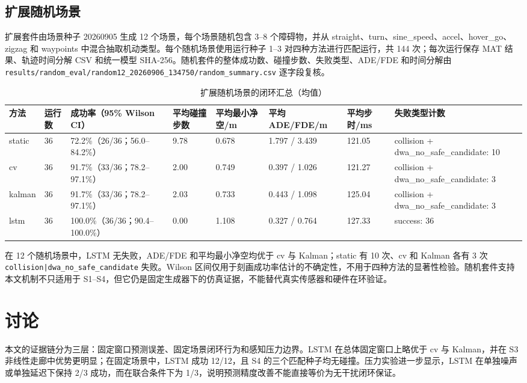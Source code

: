 \documentclass[11pt,a4paper]{ctexart}
\begin{document}
\subsection{扩展随机场景}

扩展套件由场景种子 20260905 生成 12 个场景，每个场景随机包含 3–8 个障碍物，并从 straight、turn、sine\_speed、accel、hover\_go、zigzag 和 waypoints 中混合抽取机动类型。每个随机场景使用运行种子 1–3 对四种方法进行匹配运行，共 144 次；每次运行保存 MAT 结果、轨迹时间分解 CSV 和统一模型 SHA-256。随机套件的整体成功数、碰撞步数、失败类型、ADE/FDE 和时间分解由 \texttt{results/random\_eval/random12\_20260906\_134750/random\_summary.csv} 逐字段复核。

\begin{table}[t]
\centering
\small
\caption{扩展随机场景的闭环汇总（均值）}
\label{tab:table-9}
\begin{tabularx}{\linewidth}{YYYYYYYY}
\toprule
方法 & 运行数 & 成功率（95\% Wilson CI） & 平均碰撞步数 & 平均最小净空/m & 平均 ADE/FDE/m & 平均步时/ms & 失败类型计数 \\
\midrule
static & 36 & 72.2\%（26/36；56.0–84.2\%） & 9.78 & 0.678 & 1.797 / 3.439 & 121.05 & collision + dwa\_no\_safe\_candidate: 10 \\
cv & 36 & 91.7\%（33/36；78.2–97.1\%） & 2.00 & 0.749 & 0.397 / 1.026 & 121.27 & collision + dwa\_no\_safe\_candidate: 3 \\
kalman & 36 & 91.7\%（33/36；78.2–97.1\%） & 2.03 & 0.733 & 0.443 / 1.098 & 125.04 & collision + dwa\_no\_safe\_candidate: 3 \\
lstm & 36 & 100.0\%（36/36；90.4–100.0\%） & 0.00 & 1.108 & 0.327 / 0.764 & 127.33 & success: 36 \\
\bottomrule
\end{tabularx}
\end{table}

在 12 个随机场景中，LSTM 无失败，ADE/FDE 和平均最小净空均优于 cv 与 Kalman；static 有 10 次、cv 和 Kalman 各有 3 次 \texttt{collision|dwa\_no\_safe\_candidate} 失败。Wilson 区间仅用于刻画成功率估计的不确定性，不用于四种方法的显著性检验。随机套件支持本文机制不只适用于 S1–S4，但它仍是固定生成器下的仿真证据，不能替代真实传感器和硬件在环验证。

\section{讨论}

本文的证据链分为三层：固定窗口预测误差、固定场景闭环行为和感知压力边界。LSTM 在总体固定窗口上略优于 cv 与 Kalman，并在 S3 非线性走廊中优势更明显；在固定场景中，LSTM 成功 12/12，且 S4 的三个匹配种子均无碰撞。压力实验进一步显示，LSTM 在单独噪声或单独延迟下保持 2/3 成功，而在联合条件下为 1/3，说明预测精度改善不能直接等价为无干扰闭环保证。
\end{document}
